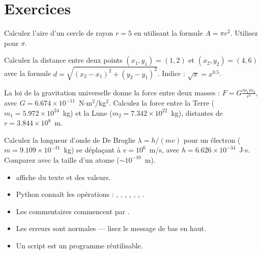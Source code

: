 \section{Exercices}

\begin{exercice}
Calculez l'aire d'un cercle de rayon $r = 5$ en utilisant la formule $A = \pi r^2$. Utilisez  pour $\pi$.
\end{exercice}

\begin{exercice}
Calculez la distance entre deux points $(x_1, y_1) = (1, 2)$ et $(x_2, y_2) = (4, 6)$ avec la formule $d = \sqrt{(x_2-x_1)^2 + (y_2-y_1)^2}$. Indice : $\sqrt{x} = x^{0.5}$.
\end{exercice}

\begin{exercice}
La loi de la gravitation universelle donne la force entre deux masses : $F = G\frac{m_1 m_2}{r^2}$, avec $G = 6.674 \times 10^{-11}$~N$\cdot$m$^2$/kg$^2$. Calculez la force entre la Terre ($m_1 = 5.972 \times 10^{24}$~kg) et la Lune ($m_2 = 7.342 \times 10^{22}$~kg), distantes de $r = 3.844 \times 10^{8}$~m.
\end{exercice}

\begin{exercice}
Calculez la longueur d'onde de De Broglie $\lambda = h / (mv)$ pour un \'electron ($m = 9.109 \times 10^{-31}$~kg) se d\'epla\c{c}ant \`a $v = 10^6$~m/s, avec $h = 6.626 \times 10^{-34}$~J$\cdot$s. Comparez avec la taille d'un atome ($\sim 10^{-10}$~m).
\end{exercice}

\begin{formules}[title=\textbf{R\'esum\'e du chapitre}]
\begin{itemize}
\item {} affiche du texte et des valeurs.
\item Python conna\^it les op\'erations : \py{+}, \py{-}, \py{*}, \py{/}, \py{//}, \py{\%}, \py{**}.
\item Les commentaires commencent par \py{#}.
\item Les erreurs sont normales --- lisez le message de bas en haut.
\item Un script  est un programme r\'eutilisable.
\end{itemize}
\end{formules}
